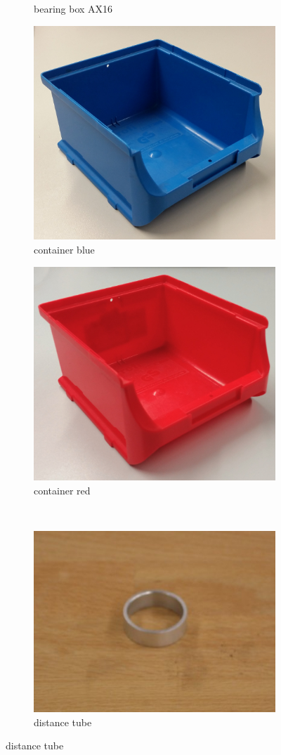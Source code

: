 \begin{figure}[!htb]
\begin{subfigure}{.3\textwidth}
  \caption{bearing box AX16}
  \label{fig:bearingBoxAX16}
\end{subfigure}
\begin{subfigure}{.3\textwidth}
  \centering
  \includegraphics[width=.5\linewidth]{images/container_blue}
  \caption{container blue \cite{github_robocup@work}}
  \label{fig:container_blue}
\end{subfigure}
\begin{subfigure}{.3\textwidth}
  \centering
  \includegraphics[width=.5\linewidth]{images/container_red}
  \caption{container red \cite{github_robocup@work}}
  \label{fig:container_red}
\end{subfigure}\\
\vspace{3mm}
\begin{subfigure}{.3\textwidth}
  \centering
  \includegraphics[width=.5\linewidth]{images/distanceTube}
  \caption{distance tube \cite{github_robocup@work}}

\end{subfigure}
\end{figure}
